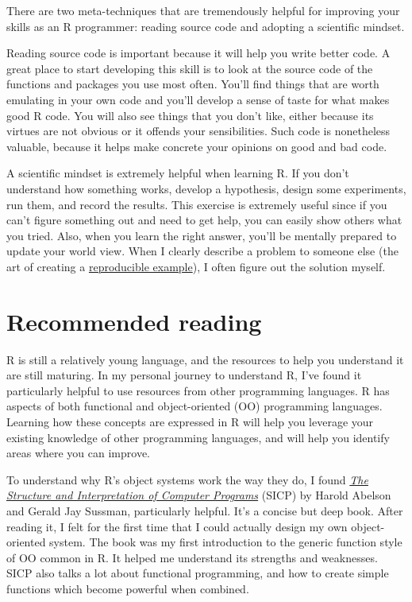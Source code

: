 There are two meta-techniques that are tremendously helpful for
improving your skills as an R programmer: reading source code and
adopting a scientific mindset.

Reading source code is important because it will help you write better
code. A great place to start developing this skill is to look at the
source code of the functions and packages you use most often. You'll
find things that are worth emulating in your own code and you'll develop
a sense of taste for what makes good R code. You will also see things
that you don't like, either because its virtues are not obvious or it
offends your sensibilities. Such code is nonetheless valuable, because
it helps make concrete your opinions on good and bad code.

A scientific mindset is extremely helpful when learning R. If you don't
understand how something works, develop a hypothesis, design some
experiments, run them, and record the results. This exercise is
extremely useful since if you can't figure something out and need to get
help, you can easily show others what you tried. Also, when you learn
the right answer, you'll be mentally prepared to update your world view.
When I clearly describe a problem to someone else (the art of creating a
\href{http://stackoverflow.com/questions/5963269}{reproducible
example}), I often figure out the solution myself.

\section{Recommended reading}\label{recommended-reading}

R is still a relatively young language, and the resources to help you
understand it are still maturing. In my personal journey to understand
R, I've found it particularly helpful to use resources from other
programming languages. R has aspects of both functional and
object-oriented (OO) programming languages. Learning how these concepts
are expressed in R will help you leverage your existing knowledge of
other programming languages, and will help you identify areas where you
can improve.

To understand why R's object systems work the way they do, I found
\href{http://mitpress.mit.edu/sicp/full-text/book/book.html}{\emph{The
Structure and Interpretation of Computer Programs}} (SICP) by Harold
Abelson and Gerald Jay Sussman, particularly helpful. It's a concise but
deep book. After reading it, I felt for the first time that I could
actually design my own object-oriented system. The book was my first
introduction to the generic function style of OO common in R. It helped
me understand its strengths and weaknesses. SICP also talks a lot about
functional programming, and how to create simple functions which become
powerful when combined.

